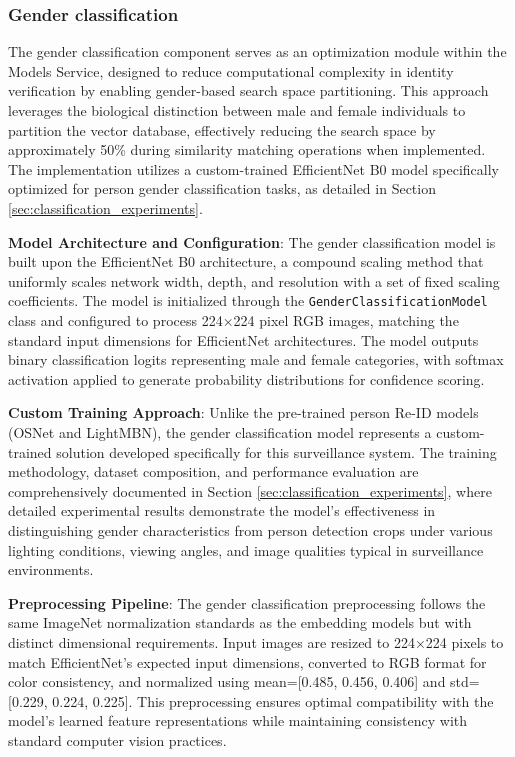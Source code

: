 \subsubsection{Gender classification}

The gender classification component serves as an optimization module within the Models Service, designed to reduce computational complexity in identity verification by enabling gender-based search space partitioning. This approach leverages the biological distinction between male and female individuals to partition the vector database, effectively reducing the search space by approximately 50\% during similarity matching operations when implemented. The implementation utilizes a custom-trained EfficientNet B0 model specifically optimized for person gender classification tasks, as detailed in Section \ref{sec:classification_experiments}.

\textbf{Model Architecture and Configuration}: The gender classification model is built upon the EfficientNet B0 architecture, a compound scaling method that uniformly scales network width, depth, and resolution with a set of fixed scaling coefficients. The model is initialized through the \texttt{GenderClassificationModel} class and configured to process 224×224 pixel RGB images, matching the standard input dimensions for EfficientNet architectures. The model outputs binary classification logits representing male and female categories, with softmax activation applied to generate probability distributions for confidence scoring.

\textbf{Custom Training Approach}: Unlike the pre-trained person Re-ID models (OSNet and LightMBN), the gender classification model represents a custom-trained solution developed specifically for this surveillance system. The training methodology, dataset composition, and performance evaluation are comprehensively documented in Section \ref{sec:classification_experiments}, where detailed experimental results demonstrate the model's effectiveness in distinguishing gender characteristics from person detection crops under various lighting conditions, viewing angles, and image qualities typical in surveillance environments.

\textbf{Preprocessing Pipeline}: The gender classification preprocessing follows the same ImageNet normalization standards as the embedding models but with distinct dimensional requirements. Input images are resized to 224×224 pixels to match EfficientNet's expected input dimensions, converted to RGB format for color consistency, and normalized using mean=[0.485, 0.456, 0.406] and std=[0.229, 0.224, 0.225]. This preprocessing ensures optimal compatibility with the model's learned feature representations while maintaining consistency with standard computer vision practices.

